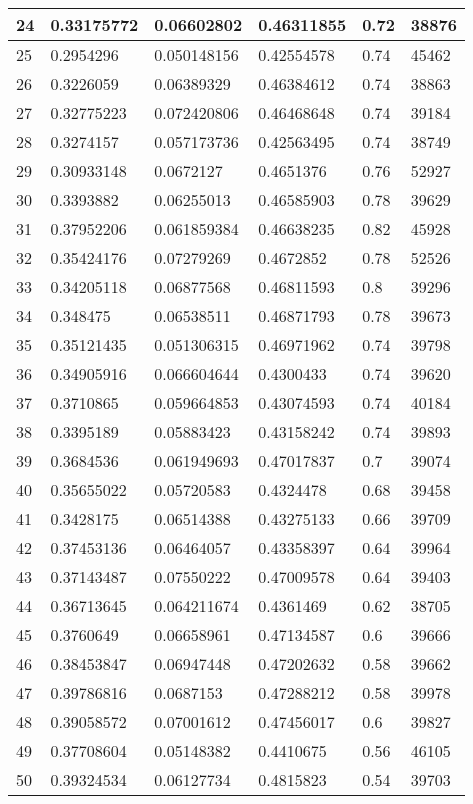 \begin{longtable}{|l|l|l|l|l|l|}
24 & 0.33175772 & 0.06602802 & 0.46311855 & 0.72 & 38876 \\ \hline 
25 & 0.2954296 & 0.050148156 & 0.42554578 & 0.74 & 45462 \\ \hline 
26 & 0.3226059 & 0.06389329 & 0.46384612 & 0.74 & 38863 \\ \hline 
27 & 0.32775223 & 0.072420806 & 0.46468648 & 0.74 & 39184 \\ \hline 
28 & 0.3274157 & 0.057173736 & 0.42563495 & 0.74 & 38749 \\ \hline 
29 & 0.30933148 & 0.0672127 & 0.4651376 & 0.76 & 52927 \\ \hline 
30 & 0.3393882 & 0.06255013 & 0.46585903 & 0.78 & 39629 \\ \hline 
31 & 0.37952206 & 0.061859384 & 0.46638235 & 0.82 & 45928 \\ \hline 
32 & 0.35424176 & 0.07279269 & 0.4672852 & 0.78 & 52526 \\ \hline 
33 & 0.34205118 & 0.06877568 & 0.46811593 & 0.8 & 39296 \\ \hline 
34 & 0.348475 & 0.06538511 & 0.46871793 & 0.78 & 39673 \\ \hline 
35 & 0.35121435 & 0.051306315 & 0.46971962 & 0.74 & 39798 \\ \hline 
36 & 0.34905916 & 0.066604644 & 0.4300433 & 0.74 & 39620 \\ \hline 
37 & 0.3710865 & 0.059664853 & 0.43074593 & 0.74 & 40184 \\ \hline 
38 & 0.3395189 & 0.05883423 & 0.43158242 & 0.74 & 39893 \\ \hline 
39 & 0.3684536 & 0.061949693 & 0.47017837 & 0.7 & 39074 \\ \hline 
40 & 0.35655022 & 0.05720583 & 0.4324478 & 0.68 & 39458 \\ \hline 
41 & 0.3428175 & 0.06514388 & 0.43275133 & 0.66 & 39709 \\ \hline 
42 & 0.37453136 & 0.06464057 & 0.43358397 & 0.64 & 39964 \\ \hline 
43 & 0.37143487 & 0.07550222 & 0.47009578 & 0.64 & 39403 \\ \hline 
44 & 0.36713645 & 0.064211674 & 0.4361469 & 0.62 & 38705 \\ \hline 
45 & 0.3760649 & 0.06658961 & 0.47134587 & 0.6 & 39666 \\ \hline 
46 & 0.38453847 & 0.06947448 & 0.47202632 & 0.58 & 39662 \\ \hline 
47 & 0.39786816 & 0.0687153 & 0.47288212 & 0.58 & 39978 \\ \hline 
48 & 0.39058572 & 0.07001612 & 0.47456017 & 0.6 & 39827 \\ \hline 
49 & 0.37708604 & 0.05148382 & 0.4410675 & 0.56 & 46105 \\ \hline 
50 & 0.39324534 & 0.06127734 & 0.4815823 & 0.54 & 39703 \\ \hline 
\end{longtable}
